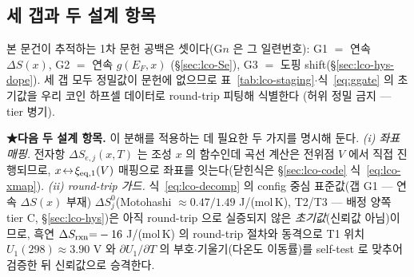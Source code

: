 \subsection{세 갭과 두 설계 항목}\label{sec:lco-decomp-gaps}
본 문건이 추적하는 1차 문헌 공백은 셋이다(G$n$ 은 그 일련번호): G1 $=$ 연속 $\Delta S(x)$, G2 $=$ 연속 $g(E_F,x)$
(\S\ref{sec:lco-Se}), G3 $=$ 도핑 shift(\S\ref{sec:lco-hys-dope}). 세 갭 모두 정밀값이 문헌에 없으므로
표~\ref{tab:lco-staging}$\cdot$식~\eqref{eq:ggate} 의 초기값을 우리 코인 하프셀 데이터로 round-trip 피팅해 식별한다
(허위 정밀 금지 --- tier 병기).

\textbf{★다음 두 설계 항목.} 이 분해를 적용하는 데 필요한 두 가지를 명시해 둔다.
\emph{(i) 좌표 매핑.} 전자항 $\Delta S_{e,j}(x,T)$ 는 조성 $x$ 의 함수인데 곡선 계산은 전위점 $V$ 에서 직접 진행되므로,
$x\!\leftrightarrow\!\xi_{\mathrm{eq},1}(V)$ 매핑으로 좌표를 잇는다(닫힌식은 \S\ref{sec:lco-code} 식~\eqref{eq:lco-xmap}).
\emph{(ii) round-trip 가드.} 식~\eqref{eq:lco-decomp} 의 config 중심 표준값(갭 G1 --- 연속 $\Delta S(x)$ 부재)
$\Delta S_j^0$(Motohashi\cite{motohashi2009} $\approx0.47/1.49$ J/(mol\,K), T2/T3 --- 배정 양쪽 tier C,
\S\ref{sec:lco-hys})은 아직 round-trip 으로 실증되지 않은
\emph{초기값}(신뢰값 아님)이므로, 흑연 $\Delta S_{\mathrm{rxn}}{=}-16$ J/(mol\,K) 의 round-trip 절차와 동격으로 T1 위치
$U_1(298)\approx3.90$ V 와 $\partial U_1/\partial T$ 의 부호$\cdot$기울기(다온도 이동률)를 self-test 로 맞추어
검증한 뒤 신뢰값으로 승격한다.

